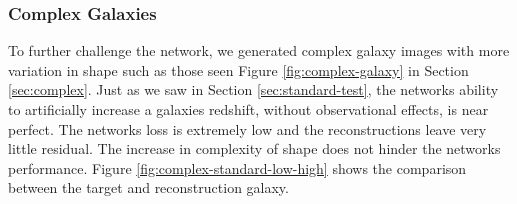 \documentclass[fleqn,usenatbib]{mnras}
\begin{document}
\subsubsection{Complex Galaxies} \label{sec:complex-redshifting}
To further challenge the network, we generated complex galaxy images with more variation in shape such as those seen Figure \ref{fig:complex-galaxy} in Section \ref{sec:complex}. Just as we saw in Section \ref{sec:standard-test}, the networks ability to artificially increase a galaxies redshift, without observational effects, is near perfect. The networks loss is extremely low and the reconstructions leave very little residual. The increase in complexity of shape does not hinder the networks performance. Figure \ref{fig:complex-standard-low-high} shows the comparison between the target and reconstruction galaxy.
\end{document}
